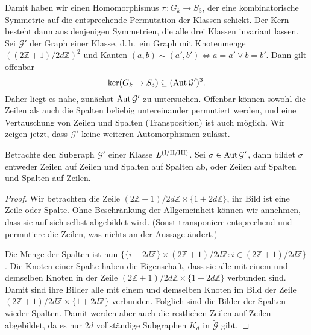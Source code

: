 Damit haben wir einen Homomorphismus $\pi: G_k \to S_3$, der eine kombinatorische Symmetrie auf die entsprechende Permutation der Klassen schickt. Der Kern besteht dann aus denjenigen Symmetrien, die alle drei Klassen invariant lassen. Sei $\mathcal G'$ der Graph einer Klasse, d.\,h.~ein Graph mit Knotenmenge $((2\mathbb Z+1)/2d\mathbb Z)^2$ und Kanten $(a,b) \sim (a',b') \Longleftrightarrow a=a' \vee b=b'$. Dann gilt offenbar
\begin{equation}
\ker(G_k \rightarrow S_3) \subseteq (\operatorname{Aut} \mathcal G')^3.
\end{equation}
Daher liegt es nahe, zunächst $\operatorname{Aut} \mathcal G'$ zu untersuchen. Offenbar können sowohl die Zeilen als auch die Spalten beliebig untereinander permutiert werden, und eine Vertauschung von Zeilen und Spalten (Transposition) ist auch möglich. Wir zeigen jetzt, dass $\mathcal G'$ keine weiteren Automorphismen zulässt.
\begin{lemma}
Betrachte den Subgraph $\mathcal G'$ einer Klasse $\Lcl(I/II/III)$. Sei $\sigma \in \operatorname{Aut} \mathcal G'$, dann bildet $\sigma$ entweder Zeilen auf Zeilen und Spalten auf Spalten ab, oder Zeilen auf Spalten und Spalten auf Zeilen.
\end{lemma}
\begin{proof}
Wir betrachten die Zeile $(2\mathbb Z+1)/2d\mathbb Z \times \{1 + 2d\mathbb Z\}$, ihr Bild ist eine Zeile oder Spalte. Ohne Beschränkung der Allgemeinheit können wir annehmen, dass sie auf sich selbst abgebildet wird. (Sonst transponiere entsprechend und permutiere die Zeilen, was nichts an der Aussage ändert.)

Die Menge der Spalten ist nun $\{\{i + 2d\mathbb Z\} \times (2\mathbb Z+1)/2d\mathbb Z : i \in (2\mathbb Z+1)/2d\mathbb Z\}$. Die Knoten einer Spalte haben die Eigenschaft, dass sie alle mit einem und demselben Knoten in der Zeile $(2\mathbb Z+1)/2d\mathbb Z \times \{1 + 2d\mathbb Z\}$ verbunden sind. Damit sind ihre Bilder alle mit einem und demselben Knoten im Bild der Zeile $(2\mathbb Z+1)/2d\mathbb Z \times \{1 + 2d\mathbb Z\}$ verbunden. Folglich sind die Bilder der Spalten wieder Spalten. Damit werden aber auch die restlichen Zeilen auf Zeilen abgebildet, da es nur $2d$ vollständige Subgraphen $K_d$ in $\tilde{\mathcal G}$ gibt.
\end{proof}


